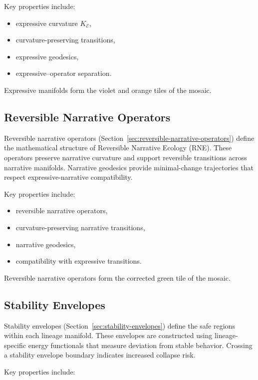 Key properties include:

\begin{itemize}
    \item expressive curvature $K_{\mathcal{E}}$,
    \item curvature-preserving transitions,
    \item expressive geodesics,
    \item expressive–operator separation.
\end{itemize}

Expressive manifolds form the violet and orange tiles of the mosaic.

\subsection{Reversible Narrative Operators}

Reversible narrative operators (Section~\ref{sec:reversible-narrative-operators})
define the mathematical structure of Reversible Narrative Ecology (RNE). These
operators preserve narrative curvature and support reversible transitions across
narrative manifolds. Narrative geodesics provide minimal-change trajectories that
respect expressive-narrative compatibility.

Key properties include:

\begin{itemize}
    \item reversible narrative operators,
    \item curvature-preserving narrative transitions,
    \item narrative geodesics,
    \item compatibility with expressive transitions.
\end{itemize}

Reversible narrative operators form the corrected green tile of the mosaic.

\subsection{Stability Envelopes}

Stability envelopes (Section~\ref{sec:stability-envelopes}) define the safe
regions within each lineage manifold. These envelopes are constructed using
lineage-specific energy functionals that measure deviation from stable behavior.
Crossing a stability envelope boundary indicates increased collapse risk.

Key properties include:


